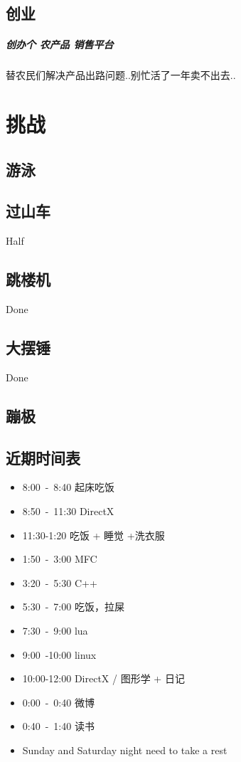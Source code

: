 \documentclass[UTF8,a4paper,8pt]{ctexbook}
\begin{document}
	\section{创业}
	    \paragraph{创办个 农产品 销售平台}替农民们解决产品出路问题..别忙活了一年卖不出去..
   
\chapter{挑战}
	\section{游泳}
		
		
	\section{过山车}
		Half 
		
	\section{跳楼机}    
		Done
		
	\section{大摆锤}
		Done
		
    \section{蹦极}
    
    
    \section*{近期时间表}
     \begin{itemize}
     	\item 8:00\ -\ 8:40 起床吃饭
     	\item 8:50\ -\ 11:30 DirectX
     	\item 11:30-1:20  吃饭 + 睡觉 +洗衣服
    	\item 1:50\ -\ 3:00  MFC
     	\item 3:20\ -\ 5:30  C++
     	\item 5:30\ -\ 7:00  吃饭，拉屎
     	\item 7:30\ -\ 9:00  lua
     	\item 9:00\ -10:00   linux
        \item 10:00-12:00 DirectX / 图形学  + 日记
        \item 0:00\ -\ 0:40 微博
        \item 0:40\ -\ 1:40 读书
        \item Sunday and Saturday night need to take a rest
      \end{itemize} 	
     		    
     		     
\end{document}
